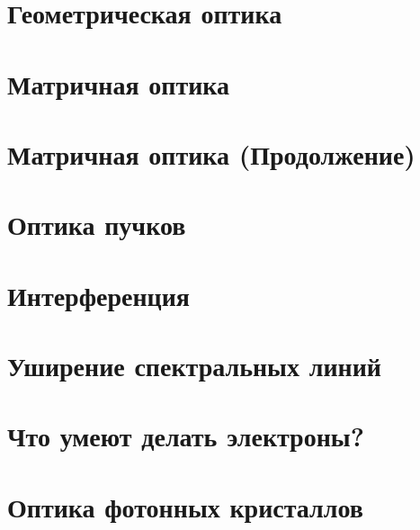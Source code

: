 


\section{Геометрическая оптика}

\newpage 

\section{Матричная оптика}


\section{Матричная оптика (Продолжение)}


\section{Оптика пучков}


\section{Интерференция}


\section{Уширение спектральных линий}


\section{Что умеют делать электроны?}


% 

\section{Оптика фотонных кристаллов}




